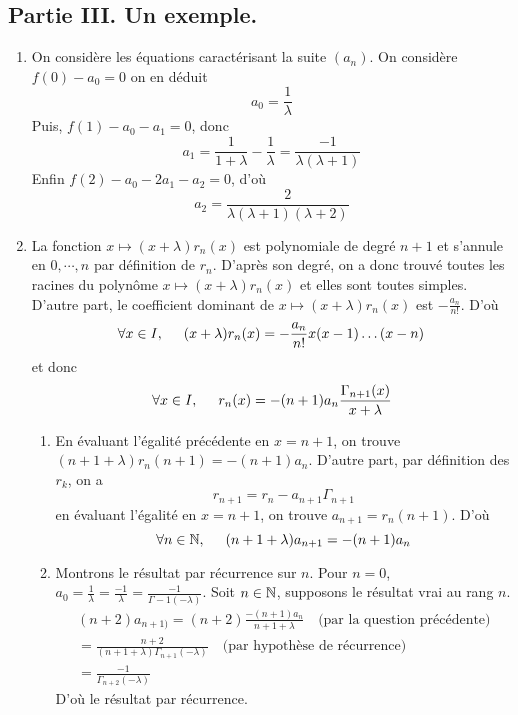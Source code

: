 \subsection*{Partie III. Un exemple.}
\begin{enumerate}
\item On considère les équations caractérisant la suite $(a_n)$. On considère $f(0)-a_0=0$ on en déduit $$a_0=\frac 1\lambda$$
Puis, $f(1)-a_0-a_1=0$, donc $$a_1=\frac 1{1+\lambda}- \frac 1\lambda=\frac {-1}{\lambda(\lambda+1)}$$
Enfin $f(2)-a_0-2a_1-a_2=0$, d'où $$a_2=\frac 2{\lambda(\lambda+1)(\lambda+2)}$$

\item La fonction $x\mapsto (x+\lambda)r_n(x)$ est polynomiale de degré $n+1$ et s'annule en $0, \cdots, n$ par définition de $r_n$. D'après son degré, on a donc  trouvé toutes les racines du polynôme $x\mapsto (x+\lambda)r_n(x)$ et elles sont toutes simples. D'autre part, le coefficient dominant de  $x\mapsto (x+\lambda)r_n(x)$ est $-\frac{a_n}{n!}$. D'où
\begin{displaymath}
 \forall x\in I,\hspace{0.5cm} (x+\lambda)r_n(x) = -\frac{a_n}{n!}x(x-1)\dots(x-n)
\end{displaymath}
et donc 
\begin{displaymath}
 \forall x\in I,\hspace{0.5cm} r_n(x) = -(n+1)a_n\frac{\Gamma_{n+1}(x)}{x+\lambda}
\end{displaymath}
\begin{enumerate}

\item En évaluant  l'égalité  précédente en $x=n+1$, on trouve $(n+1+\lambda)r_n(n+1)=-(n+1)a_n$.\newline
D'autre part, par définition des $r_k$, on a 
\begin{displaymath}
 r_{n+1}=r_n-a_{n+1}\Gamma_{n+1}
\end{displaymath}
en évaluant l'égalité en  $x=n+1$, on trouve $a_{n+1}=r_n(n+1)$.\newline
D'où
\begin{displaymath}
 \forall n \in \mathbb{N},\hspace{0.5cm} (n+1+\lambda)a_{n+1} = -(n+1)a_n
\end{displaymath}

\item Montrons le résultat par récurrence sur $n$.\newline
Pour $n=0$, $a_0=\frac 1\lambda=\frac {-1}{\lambda}=\frac {-1}{\Gamma-1(-\lambda)}$.\newline
Soit $n\in\mathbb{N}$, supposons le résultat vrai au rang $n$.
\begin{multline*}
(n+2)a_{n+1)} = (n+2)\frac{-(n+1)a_n}{n+1+\lambda}\quad\text{(par la question précédente)}\\
 = \frac{n+2}{(n+1+\lambda)\Gamma_{n+1}(-\lambda)}\quad\text{(par hypothèse de récurrence)}\\
 = \frac{-1}{\Gamma_{n+2}(-\lambda)}
\end{multline*}
D'où le résultat par récurrence.


\end{enumerate}
\end{enumerate}
